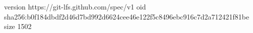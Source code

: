 version https://git-lfs.github.com/spec/v1
oid sha256:b0f184dbdf2d46d7bd992d6624cee46e122f5c8496ebc916c7d2a712421f81be
size 1502
